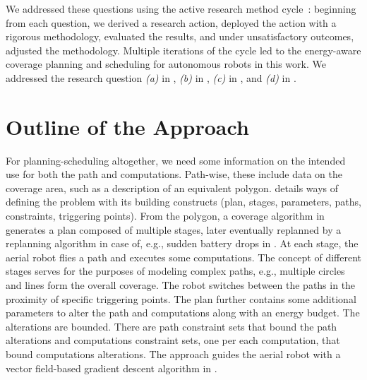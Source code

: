 We addressed these questions using the active research method cycle~\citep{gerald1978assessment}: beginning from each question, we derived a research action, deployed the action with a rigorous methodology, evaluated the results, and under unsatisfactory outcomes, adjusted the methodology. Multiple iterations of the cycle led to the energy-aware coverage planning and scheduling for autonomous robots in this work. We addressed the research question \textit{(a)} in , \textit{(b)} in , \textit{(c)} in , and \textit{(d)} in .


\section{Outline of the Approach}
\label{sec:outline}

For planning-scheduling altogether, we need some information on the intended use for both the path and computations. Path-wise, these include data on the coverage area, such as a description of an equivalent polygon.  details ways of defining the problem with its building constructs (plan, stages, parameters, paths, constraints, triggering points). From the polygon, a coverage algorithm in  generates a plan composed of multiple stages, later eventually replanned by a replanning algorithm in case of, e.g., sudden battery drops in . At each stage, the aerial robot flies a path and executes some computations. The concept of different stages serves for the purposes of modeling complex paths, e.g., multiple circles and lines form the overall coverage. The robot switches between the paths in the proximity of specific triggering points. The plan further contains some additional parameters to alter the path and computations along with an energy budget. The alterations are bounded. There are path constraint sets that bound the path alterations and computations constraint sets, one per each computation, that bound computations alterations. The approach guides the aerial robot with a vector field-based gradient descent algorithm in . 

